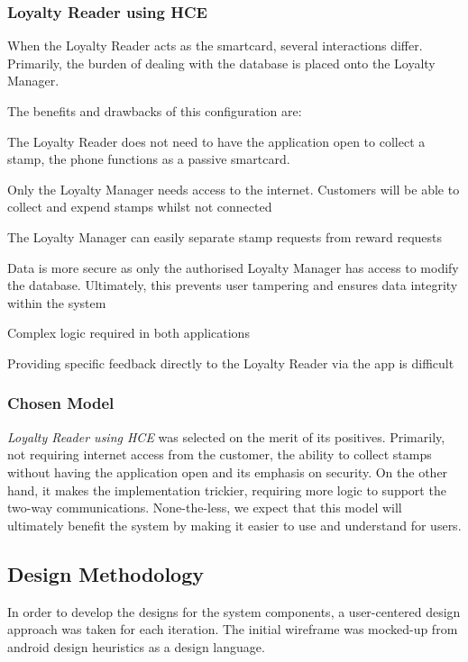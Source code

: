 \subsubsection{Loyalty Reader using HCE}
When the Loyalty Reader acts as the smartcard, several interactions differ. Primarily, the burden of dealing with the database is placed onto the Loyalty Manager.

The benefits and drawbacks of this configuration are: 
\begin{description}[leftmargin=!,labelwidth=\widthof{\bfseries small}]
    \item[+] The Loyalty Reader does not need to have the application open to collect a stamp, the phone functions as a passive smartcard.
    \item[+] Only the Loyalty Manager needs access to the internet. Customers will be able to collect and expend stamps whilst not connected
    \item[+] The Loyalty Manager can easily separate stamp requests from reward requests
    \item[+] Data is more secure as only the authorised Loyalty Manager has access to modify the database. Ultimately, this prevents user tampering and ensures data integrity within the system
    \item[---] Complex logic required in both applications
    \item[---] Providing specific feedback directly to the Loyalty Reader via the app is difficult
\end{description}

\subsubsection{Chosen Model}
\emph{Loyalty Reader using HCE} was selected on the merit of its positives. Primarily, not requiring internet access from the customer, the ability to collect stamps without having the application open and its emphasis on security. On the other hand, it makes the implementation trickier, requiring more logic to support the two-way communications. None-the-less, we expect that this model will ultimately benefit the system by making it easier to use and understand for users.

\subsection{Design Methodology}
In order to develop the designs for the system components, a user-centered design approach was taken for each iteration. The initial wireframe was mocked-up from android design heuristics as a design language.
